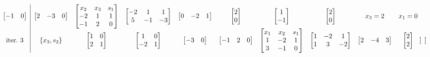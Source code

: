 \begin{equation*}
{\begin{array}{ c|c c c c c c c c c c c c c }
\begin{bmatrix}
-1 & 0
\end{bmatrix} & \begin{bmatrix}
2 & -3 & 0
\end{bmatrix} & \begin{bmatrix}
x_{2} & x_{3} & s_{1}\\
-2 & 1 & 1\\
-1 & 2 & 0
\end{bmatrix} & \begin{bmatrix}
-2 & 1 & 1\\
5 & -1 & -3
\end{bmatrix} & \begin{bmatrix}
0 & -2 & 1
\end{bmatrix} & \begin{bmatrix}
2\\
0
\end{bmatrix} & \begin{bmatrix}
1\\
-1
\end{bmatrix} & \begin{bmatrix}
2\\
0
\end{bmatrix} & x_{3} =2 & x_{1} =0\\
\text{iter.} \ 3 & \{x_{3} ,s_{2}\} & \begin{bmatrix}
1 & 0\\
2 & 1
\end{bmatrix} & \begin{bmatrix}
1 & 0\\
-2 & 1
\end{bmatrix} & \begin{bmatrix}
-3 & 0
\end{bmatrix} & \begin{bmatrix}
-1 & 2 & 0
\end{bmatrix} & \begin{bmatrix}
x_{1} & x_{2} & s_{1}\\
1 & -2 & 1\\
3 & -1 & 0
\end{bmatrix} & \begin{bmatrix}
1 & -2 & 1\\
1 & 3 & -2
\end{bmatrix} & \begin{bmatrix}
2 & -4 & 3
\end{bmatrix} & \begin{bmatrix}
2\\
2
\end{bmatrix} & \begin{bmatrix}

\end{bmatrix}
\end{array}}
\end{equation*}
